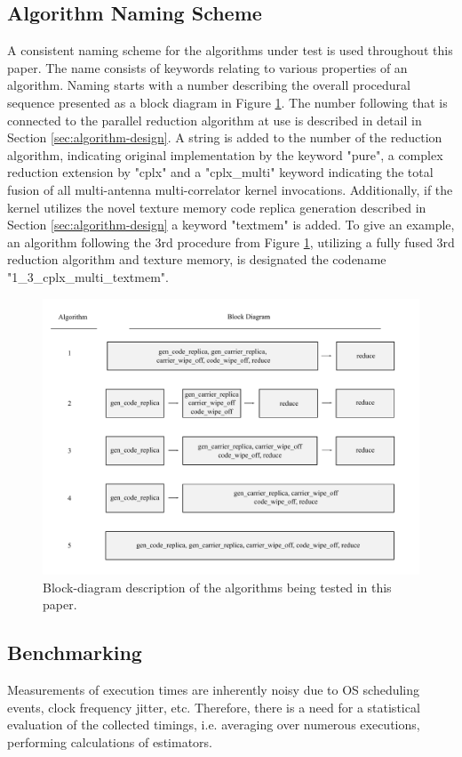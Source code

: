 \documentclass{juliacon}
\begin{document}
\subsection*{Algorithm Naming Scheme}
A consistent naming scheme for the algorithms under test is used throughout this paper. The name consists of keywords relating to various properties of an algorithm. Naming starts with a number describing the overall procedural sequence presented as a block diagram in Figure \ref{fig:algorithms}. The number following that is connected to the parallel reduction algorithm at use is described in detail in Section \ref{sec:algorithm-design}. A string is added to the number of the reduction algorithm, indicating original implementation by the keyword "pure", a complex reduction extension by "cplx" and a "cplx\_multi" keyword indicating the total fusion of all multi-antenna multi-correlator kernel invocations. Additionally, if the kernel utilizes the novel texture memory code replica generation described in Section \ref{sec:algorithm-design} a keyword "textmem" is added. To give an example, an algorithm following the 3rd procedure from Figure \ref{fig:algorithms}, utilizing a fully fused 3rd reduction algorithm and texture memory, is designated the codename "1\_3\_cplx\_multi\_textmem". 

\begin{figure}[t]
\centerline{\includegraphics[width=13cm]{algorithms.pdf}}
\caption{Block-diagram description of the algorithms being tested in this paper.}
  \label{fig:algorithms}
\end{figure}

\subsection*{Benchmarking}
Measurements of execution times are inherently noisy due to OS scheduling events, clock frequency jitter, etc. Therefore, there is a need for a statistical evaluation of the collected timings, i.e. averaging over numerous executions, performing calculations of estimators.
\end{document}
